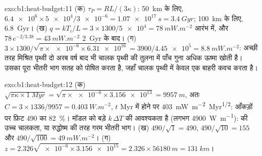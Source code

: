 \begin{solution}{exo:b1:heat-budget:11}
(क) $\tau_P = RL/(3\kappa)$: \qty{50}{km} के लिए, $\num{6.4e6}\times\num{5e4}/\num{3e-6}
= \qty{1.07e17}{s} = \qty{3.4}{Gyr}$; \qty{100}{km} के लिए, \qty{6.8}{Gyr}।
(ख) $q = kT_i/L = 3\times1300/\num{5e4} = \qty{78}{mW.m^{-2}}$ आरंभ में,
और $78\,e^{-2/3.38} = \qty{43}{mW.m^{-2}}$ \qty{2}{Gyr} के बाद। (ग)
$3\times1300/\sqrt{\pi\times\num{e-6}\times\num{6.31e16}} = 3900/\num{4.45e5} =
\qty{8.8}{mW.m^{-2}}$: अच्छी तरह मिश्रित पृथ्वी दो अरब वर्ष बाद भी चालक पृथ्वी की तुलना में पाँच गुना अधिक ऊष्मा खोती है। उसका पूरा भीतरी भाग सतह को पोषित करता है, जहाँ चालक पृथ्वी में केवल एक बाहरी कवच करता है।
\end{solution}

\begin{solution}{exo:b1:heat-budget:12}
(क) $\sqrt{\pi\kappa\times\qty{1}{Myr}} = \sqrt{\pi\times\num{e-6}\times\num{3.156e13}}
= \qty{9957}{m}$, अतः $C = 3\times1336/9957 = \qty{0.403}{W.m^{-2}}$, $t$ \unit{Myr} में होने पर \qty{403}{mW.m^{-2}.Myr^{1/2}}: आँकड़ों पर फ़िट
490 का \qty{82}{\percent}। मॉडल को बड़े $k\,\Delta T$ की आवश्यकता है (लगभग \qty{4900}{W.m^{-1}}):  की उच्च चालकता, या रुद्धोष्म की तरह गरम भीतरी भाग।
(ख) $490/\sqrt1 = 490$, $490/\sqrt{10} = 155$ और $490/\sqrt{100} =
\qty{49}{mW.m^{-2}}$। (ग) $z = 2.326\sqrt{\num{e-6}\times\num{3.156e15}} =
2.326\times\qty{56180}{m} = \qty{131}{km}$।
\end{solution}

